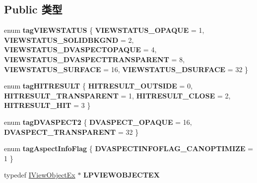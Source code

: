 \subsection*{Public 类型}
\begin{DoxyCompactItemize}
\item 
\mbox{\label{interface_i_view_object_ex_ae63d8578798e3f83e7f01b1c8313b4ec}} 
enum {\bfseries tag\+V\+I\+E\+W\+S\+T\+A\+T\+US} \{ \newline
{\bfseries V\+I\+E\+W\+S\+T\+A\+T\+U\+S\+\_\+\+O\+P\+A\+Q\+UE} = 1, 
{\bfseries V\+I\+E\+W\+S\+T\+A\+T\+U\+S\+\_\+\+S\+O\+L\+I\+D\+B\+K\+G\+ND} = 2, 
{\bfseries V\+I\+E\+W\+S\+T\+A\+T\+U\+S\+\_\+\+D\+V\+A\+S\+P\+E\+C\+T\+O\+P\+A\+Q\+UE} = 4, 
{\bfseries V\+I\+E\+W\+S\+T\+A\+T\+U\+S\+\_\+\+D\+V\+A\+S\+P\+E\+C\+T\+T\+R\+A\+N\+S\+P\+A\+R\+E\+NT} = 8, 
\newline
{\bfseries V\+I\+E\+W\+S\+T\+A\+T\+U\+S\+\_\+\+S\+U\+R\+F\+A\+CE} = 16, 
{\bfseries V\+I\+E\+W\+S\+T\+A\+T\+U\+S\+\_\+D\+S\+U\+R\+F\+A\+CE} = 32
 \}
\item 
\mbox{\label{interface_i_view_object_ex_abdf03e108d5a3d3e09a64af0178e94ce}} 
enum {\bfseries tag\+H\+I\+T\+R\+E\+S\+U\+LT} \{ {\bfseries H\+I\+T\+R\+E\+S\+U\+L\+T\+\_\+\+O\+U\+T\+S\+I\+DE} = 0, 
{\bfseries H\+I\+T\+R\+E\+S\+U\+L\+T\+\_\+\+T\+R\+A\+N\+S\+P\+A\+R\+E\+NT} = 1, 
{\bfseries H\+I\+T\+R\+E\+S\+U\+L\+T\+\_\+\+C\+L\+O\+SE} = 2, 
{\bfseries H\+I\+T\+R\+E\+S\+U\+L\+T\+\_\+\+H\+IT} = 3
 \}
\item 
\mbox{\label{interface_i_view_object_ex_aea844e37949186b53c065e016d7da341}} 
enum {\bfseries tag\+D\+V\+A\+S\+P\+E\+C\+T2} \{ {\bfseries D\+V\+A\+S\+P\+E\+C\+T\+\_\+\+O\+P\+A\+Q\+UE} = 16, 
{\bfseries D\+V\+A\+S\+P\+E\+C\+T\+\_\+\+T\+R\+A\+N\+S\+P\+A\+R\+E\+NT} = 32
 \}
\item 
\mbox{\label{interface_i_view_object_ex_a00e1aa26381f755513ef4d60415e0dd2}} 
enum {\bfseries tag\+Aspect\+Info\+Flag} \{ {\bfseries D\+V\+A\+S\+P\+E\+C\+T\+I\+N\+F\+O\+F\+L\+A\+G\+\_\+\+C\+A\+N\+O\+P\+T\+I\+M\+I\+ZE} = 1
 \}
\item 
\mbox{\label{interface_i_view_object_ex_a6ff146195475cf22a334f5fdfe749466}} 
typedef \hyperlink{interface_i_view_object_ex}{I\+View\+Object\+Ex} $\ast$ {\bfseries L\+P\+V\+I\+E\+W\+O\+B\+J\+E\+C\+T\+EX}

\end{DoxyCompactItemize}
